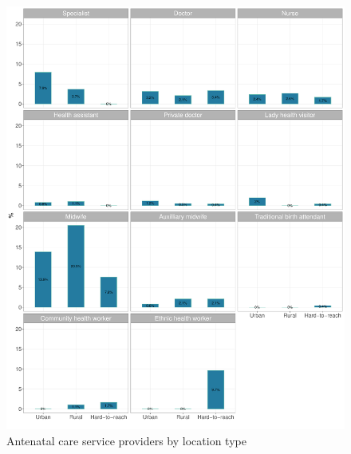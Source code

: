 \documentclass[12pt,a4paper]{article}
\begin{document}
\begin{figure}[H]

{\centering \includegraphics{kayinReport_files/figure-latex/anc1Plot-1} 

}

\caption{Antenatal care service providers by location type}\label{fig:anc1Plot}
\end{figure}
\end{document}
